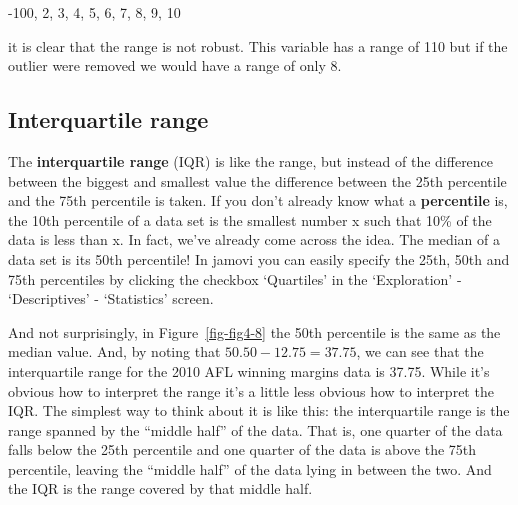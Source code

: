 \documentclass[
  a4paper,
]{book}
\begin{document}
-100, 2, 3, 4, 5, 6, 7, 8, 9, 10

it is clear that the range is not robust. This variable has a range of
110 but if the outlier were removed we would have a range of only 8.

\hypertarget{interquartile-range}{%
\subsection{Interquartile range}\label{interquartile-range}}

The \textbf{interquartile range} (IQR) is like the range, but instead of
the difference between the biggest and smallest value the difference
between the 25th percentile and the 75th percentile is taken. If you
don't already know what a \textbf{percentile} is, the 10th percentile of
a data set is the smallest number x such that 10\% of the data is less
than x. In fact, we've already come across the idea. The median of a
data set is its 50th percentile! In jamovi you can easily specify the
25th, 50th and 75th percentiles by clicking the checkbox `Quartiles' in
the `Exploration' - `Descriptives' - `Statistics' screen.

And not surprisingly, in Figure~\ref{fig-fig4-8} the 50th percentile is
the same as the median value. And, by noting that
\(50.50 - 12.75 = 37.75\), we can see that the interquartile range for
the 2010 AFL winning margins data is 37.75. While it's obvious how to
interpret the range it's a little less obvious how to interpret the IQR.
The simplest way to think about it is like this: the interquartile range
is the range spanned by the ``middle half'' of the data. That is, one
quarter of the data falls below the 25th percentile and one quarter of
the data is above the 75th percentile, leaving the ``middle half'' of
the data lying in between the two. And the IQR is the range covered by
that middle half.
\end{document}
